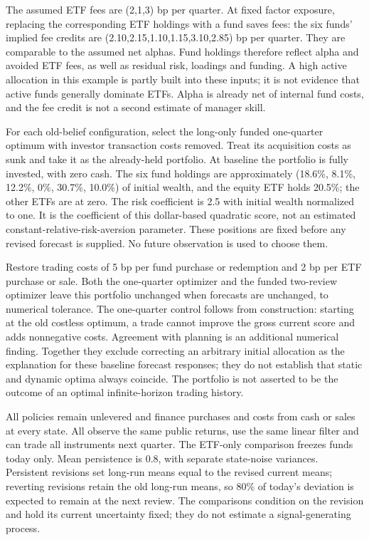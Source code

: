 \documentclass[11pt]{article}
\begin{document}
The assumed ETF fees are (2,1,3) bp per quarter. At fixed factor exposure, replacing the corresponding ETF holdings with a fund saves fees: the six funds' implied fee credits are (2.10,2.15,1.10,1.15,3.10,2.85) bp per quarter. They are comparable to the assumed net alphas. Fund holdings therefore reflect alpha and avoided ETF fees, as well as residual risk, loadings and funding. A high active allocation in this example is partly built into these inputs; it is not evidence that active funds generally dominate ETFs. Alpha is already net of internal fund costs, and the fee credit is not a second estimate of manager skill.

For each old-belief configuration, select the long-only funded one-quarter optimum with investor transaction costs removed. Treat its acquisition costs as sunk and take it as the already-held portfolio. At baseline the portfolio is fully invested, with zero cash. The six fund holdings are approximately (18.6\%, 8.1\%, 12.2\%, 0\%, 30.7\%, 10.0\%) of initial wealth, and the equity ETF holds 20.5\%; the other ETFs are at zero. The risk coefficient is 2.5 with initial wealth normalized to one. It is the coefficient of this dollar-based quadratic score, not an estimated constant-relative-risk-aversion parameter. These positions are fixed before any revised forecast is supplied. No future observation is used to choose them.

Restore trading costs of 5 bp per fund purchase or redemption and 2 bp per ETF purchase or sale. Both the one-quarter optimizer and the funded two-review optimizer leave this portfolio unchanged when forecasts are unchanged, to numerical tolerance. The one-quarter control follows from construction: starting at the old costless optimum, a trade cannot improve the gross current score and adds nonnegative costs. Agreement with planning is an additional numerical finding. Together they exclude correcting an arbitrary initial allocation as the explanation for these baseline forecast responses; they do not establish that static and dynamic optima always coincide. The portfolio is not asserted to be the outcome of an optimal infinite-horizon trading history.

All policies remain unlevered and finance purchases and costs from cash or sales at every state. All observe the same public returns, use the same linear filter and can trade all instruments next quarter. The ETF-only comparison freezes funds today only. Mean persistence is 0.8, with separate state-noise variances. Persistent revisions set long-run means equal to the revised current means; reverting revisions retain the old long-run means, so 80\% of today's deviation is expected to remain at the next review. The comparisons condition on the revision and hold its current uncertainty fixed; they do not estimate a signal-generating process.
\end{document}
